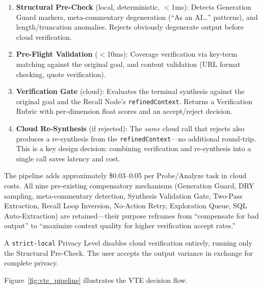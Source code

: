 \documentclass{article}
\begin{document}
\begin{enumerate}[leftmargin=*]
\item \textbf{Structural Pre-Check} (local, deterministic, $<$1ms): Detects Generation Guard markers, meta-commentary degeneration (``As an AI\ldots'' patterns), and length/truncation anomalies. Rejects obviously degenerate output before cloud verification.
\item \textbf{Pre-Flight Validation} ($<$10ms): Coverage verification via key-term matching against the original goal, and content validation (URL format checking, quote verification).
\item \textbf{Verification Gate} (cloud): Evaluates the terminal synthesis against the original goal and the Recall Node's \texttt{refinedContext}. Returns a Verification Rubric with per-dimension float scores and an accept/reject decision.
\item \textbf{Cloud Re-Synthesis} (if rejected): The \emph{same} cloud call that rejects also produces a re-synthesis from the \texttt{refinedContext}---no additional round-trip. This is a key design decision: combining verification and re-synthesis into a single call saves latency and cost.
\end{enumerate}

The pipeline adds approximately \$0.03--0.05 per Probe/Analyze task in cloud costs.
All nine pre-existing compensatory mechanisms (Generation Guard, DRY sampling, meta-commentary detection, Synthesis Validation Gate, Two-Pass Extraction, Recall Loop Inversion, No-Action Retry, Exploration Queue, SQL Auto-Extraction) are retained---their purpose reframes from ``compensate for bad output'' to ``maximize context quality for higher verification accept rates.''

A \texttt{strict-local} Privacy Level disables cloud verification entirely, running only the Structural Pre-Check. The user accepts the output variance in exchange for complete privacy.

Figure~\ref{fig:vte_pipeline} illustrates the VTE decision flow.
\end{document}
